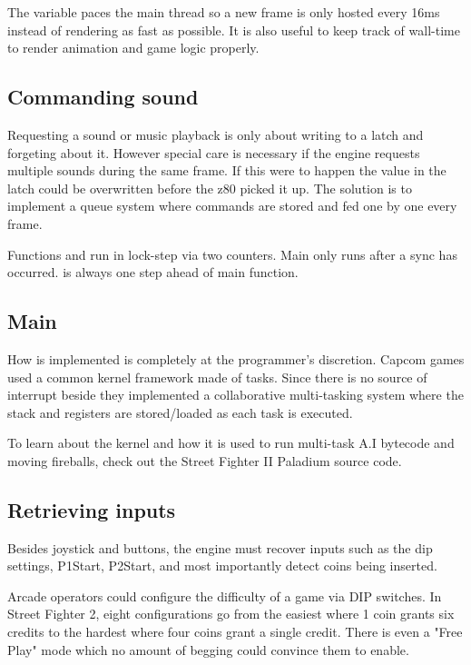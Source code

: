 \begin{trivia}
The  variable paces the main thread so a new frame is only hosted every 16ms instead of rendering as fast as possible. It is also useful to keep track of wall-time to render animation and game logic properly.
\end{trivia}


\subsection{Commanding sound}
Requesting a sound or music playback is only about writing to a latch and forgeting about it. However special care is necessary if the engine requests multiple sounds during the same frame. If this were to happen the value in the latch could be overwritten before the z80 picked it up.
The solution is to implement a queue system where commands are stored and fed one by one every frame. 

Functions  and  run in lock-step via two counters. Main only runs after a sync has occurred.  is always one step ahead of main function.

 

\subsection{Main}
 


How  is implemented is completely at the programmer's discretion. Capcom games used a common kernel framework made of tasks. Since there is no source of interrupt beside  they implemented a collaborative multi-tasking system where the stack and registers are stored/loaded as each task is executed.

To learn about the kernel and how it is used to run multi-task A.I bytecode and moving fireballs, check out the Street Fighter II Paladium source code\cite{sf2platinium}.

\subsection{Retrieving inputs}
Besides joystick and buttons, the engine must recover inputs such as the dip settings, P1Start, P2Start, and most importantly detect coins being inserted.

\begin{trivia}
Arcade operators could configure the difficulty of a game via DIP switches. In Street Fighter 2, eight configurations go from the easiest where 1 coin grants six credits to the hardest where four coins grant a single credit. There is even a "Free Play" mode which no amount of begging could convince them to enable\cite{sf2manual}.
\end{trivia}

